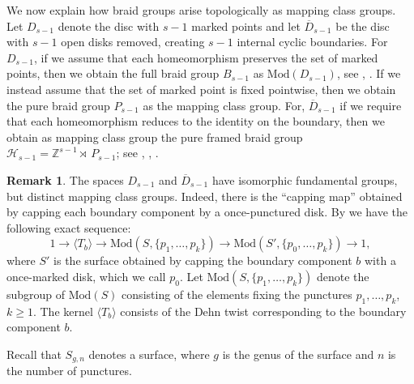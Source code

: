 \documentclass[10pt]{amsart}
\theoremstyle{definition}
\newtheorem{remark}[theorem]{Remark}
\begin{document}
We now explain how braid groups arise topologically as mapping class groups. Let $D_{s-1}$ denote the disc with $s-1$ marked points and let $\overline{D}_{s-1}$ be the disc with $s-1$ open disks removed, creating $s-1$ internal cyclic boundaries. 
For $D_{s-1}$, if we assume that each homeomorphism preserves the set of marked points, then we obtain the full braid group $B_{s-1}$ as $\mathrm{Mod}(D_{s-1})$, see \cite[9.1.3]{FarbMagalit}, \cite[Ch.1]{MR2435235}. 
If we instead assume that the set of marked point is fixed pointwise, then we obtain the pure braid group $P_{s-1}$ as the mapping class group. 
For, $\overline{D}_{s-1}$ if we require that each homeomorphism reduces to the identity on the boundary,
then we obtain as mapping class group the pure framed braid group $\mathcal{H}_{s-1}=\mathbb{Z}^{s-1}
\rtimes ~P_{s-1}$; see \cite{Bodigheimer2012-gr}, \cite[Ch. 2, P. 45]{FarbMagalit}, \cite[Th. 7.6]{Prasolov97}.




\begin{remark}
The spaces $D_{s-1}$ and $\overline{D}_{s-1}$ have isomorphic fundamental groups, but distinct mapping class groups.  Indeed, there is the ``capping map'' obtained by capping  each boundary component by a once-punctured  disk. By \cite[Proposotion~3.19]{FarbMagalit} we have the following exact sequence:
\[
  1 \rightarrow \langle T_b \rangle \rightarrow \mathrm{Mod}(S,\{p_1,\ldots,p_k\})
  \rightarrow 
  \mathrm{Mod}(S',\{p_0,\ldots,p_k\})  \rightarrow 1, 
\]
where $S'$ is the surface obtained by capping the boundary component $b$ with a once-marked disk, which we call $p_0$. Let $\mathrm{Mod}(S,\{p_1,\ldots,p_k\})$ denote the subgroup of $\mathrm{Mod}(S)$ consisting of the elements fixing the punctures $p_1,\ldots,p_k$, $k\geq 1$. The kernel $\langle T_b \rangle$ consists of the Dehn twist corresponding to the boundary component $b$. 
\end{remark}


Recall that $S_{g,n}$ denotes a surface, where $g$ is the genus of the surface and $n$ is the number of punctures. 
\end{document}
